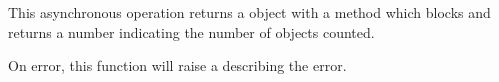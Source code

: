 This asynchronous operation returns a  object with a
 method which blocks and returns a number indicating the number
of objects counted.

On error, this function will raise a  describing
the error.
